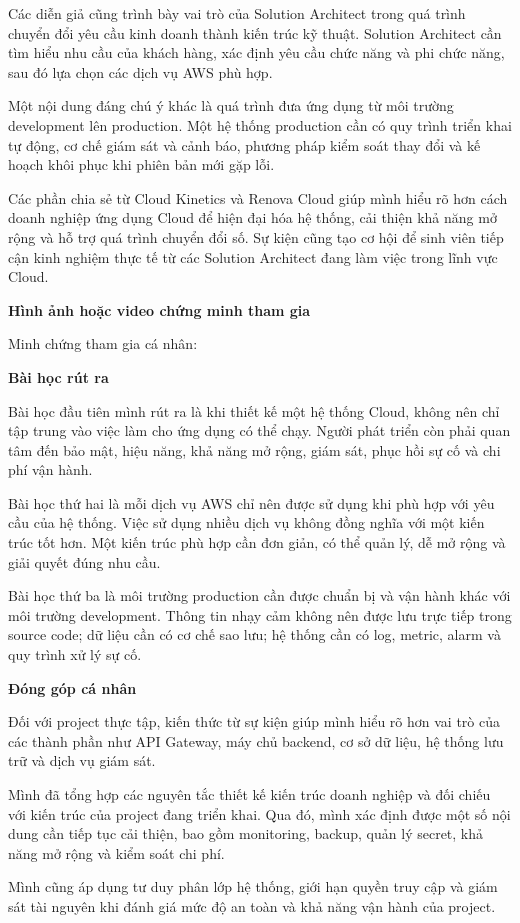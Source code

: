 Các diễn giả cũng trình bày vai trò của Solution Architect trong quá
trình chuyển đổi yêu cầu kinh doanh thành kiến trúc kỹ thuật. Solution
Architect cần tìm hiểu nhu cầu của khách hàng, xác định yêu cầu chức
năng và phi chức năng, sau đó lựa chọn các dịch vụ AWS phù hợp.

Một nội dung đáng chú ý khác là quá trình đưa ứng dụng từ môi trường
development lên production. Một hệ thống production cần có quy trình
triển khai tự động, cơ chế giám sát và cảnh báo, phương pháp kiểm soát
thay đổi và kế hoạch khôi phục khi phiên bản mới gặp lỗi.

Các phần chia sẻ từ Cloud Kinetics và Renova Cloud giúp mình hiểu rõ hơn
cách doanh nghiệp ứng dụng Cloud để hiện đại hóa hệ thống, cải thiện khả
năng mở rộng và hỗ trợ quá trình chuyển đổi số. Sự kiện cũng tạo cơ hội
để sinh viên tiếp cận kinh nghiệm thực tế từ các Solution Architect đang
làm việc trong lĩnh vực Cloud.

\vspace{0.5em}\noindent\textbf{Hình ảnh hoặc video chứng minh tham
gia}\par

Minh chứng tham gia cá nhân:

\vspace{0.5em}\noindent\textbf{Bài học rút ra}\par

Bài học đầu tiên mình rút ra là khi thiết kế một hệ thống Cloud, không
nên chỉ tập trung vào việc làm cho ứng dụng có thể chạy. Người phát
triển còn phải quan tâm đến bảo mật, hiệu năng, khả năng mở rộng, giám
sát, phục hồi sự cố và chi phí vận hành.

Bài học thứ hai là mỗi dịch vụ AWS chỉ nên được sử dụng khi phù hợp với
yêu cầu của hệ thống. Việc sử dụng nhiều dịch vụ không đồng nghĩa với
một kiến trúc tốt hơn. Một kiến trúc phù hợp cần đơn giản, có thể quản
lý, dễ mở rộng và giải quyết đúng nhu cầu.

Bài học thứ ba là môi trường production cần được chuẩn bị và vận hành
khác với môi trường development. Thông tin nhạy cảm không nên được lưu
trực tiếp trong source code; dữ liệu cần có cơ chế sao lưu; hệ thống cần
có log, metric, alarm và quy trình xử lý sự cố.

\vspace{0.5em}\noindent\textbf{Đóng góp cá nhân}\par

Đối với project thực tập, kiến thức từ sự kiện giúp mình hiểu rõ hơn vai
trò của các thành phần như API Gateway, máy chủ backend, cơ sở dữ liệu,
hệ thống lưu trữ và dịch vụ giám sát.

Mình đã tổng hợp các nguyên tắc thiết kế kiến trúc doanh nghiệp và đối
chiếu với kiến trúc của project đang triển khai. Qua đó, mình xác định
được một số nội dung cần tiếp tục cải thiện, bao gồm monitoring, backup,
quản lý secret, khả năng mở rộng và kiểm soát chi phí.

Mình cũng áp dụng tư duy phân lớp hệ thống, giới hạn quyền truy cập và
giám sát tài nguyên khi đánh giá mức độ an toàn và khả năng vận hành của
project.
